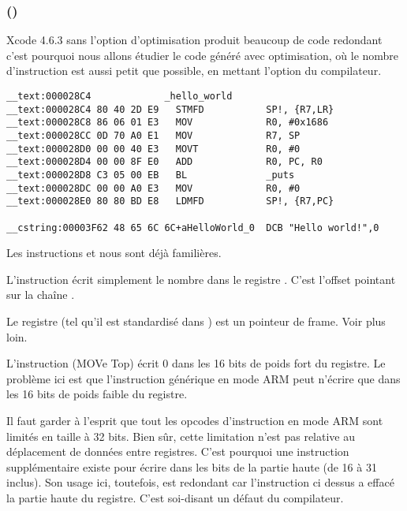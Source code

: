 \subsubsection{\OptimizingXcodeIV (\ARMMode)}

Xcode 4.6.3 sans l'option d'optimisation produit beaucoup de code redondant c'est
pourquoi nous allons étudier le code généré avec optimisation, où le nombre
d'instruction est aussi petit que possible, en mettant l'option \Othree du
compilateur.

\begin{lstlisting}[caption=\OptimizingXcodeIV (\ARMMode),style=customasmARM]
__text:000028C4             _hello_world
__text:000028C4 80 40 2D E9   STMFD           SP!, {R7,LR}
__text:000028C8 86 06 01 E3   MOV             R0, #0x1686
__text:000028CC 0D 70 A0 E1   MOV             R7, SP
__text:000028D0 00 00 40 E3   MOVT            R0, #0
__text:000028D4 00 00 8F E0   ADD             R0, PC, R0
__text:000028D8 C3 05 00 EB   BL              _puts
__text:000028DC 00 00 A0 E3   MOV             R0, #0
__text:000028E0 80 80 BD E8   LDMFD           SP!, {R7,PC}

__cstring:00003F62 48 65 6C 6C+aHelloWorld_0  DCB "Hello world!",0
\end{lstlisting}

Les instructions  et  nous sont déjà familières.


L'instruction \MOV écrit simplement le nombre  dans le registre .
C'est l'offset pointant sur la chaîne .

Le registre  (tel qu'il est standardisé dans \IOSABI) est un pointeur de frame. Voir plus loin.

L'instruction  (MOVe Top) écrit 0 dans les 16 bits de poids
fort du registre.
Le problème ici est que l'instruction générique \MOV en mode ARM peut n'écrire
que dans les 16 bits de poids faible du registre.

Il faut garder à l'esprit que tout les opcodes d'instruction en mode ARM sont
limités en taille à 32 bits. Bien sûr, cette limitation n'est pas relative
au déplacement de données entre registres.
C'est pourquoi une instruction supplémentaire existe  pour écrire dans
les bits de la partie haute (de 16 à 31 inclus).
Son usage ici, toutefois, est redondant car l'instruction 
ci dessus a effacé la partie haute du registre.
C'est soi-disant un défaut du compilateur.

